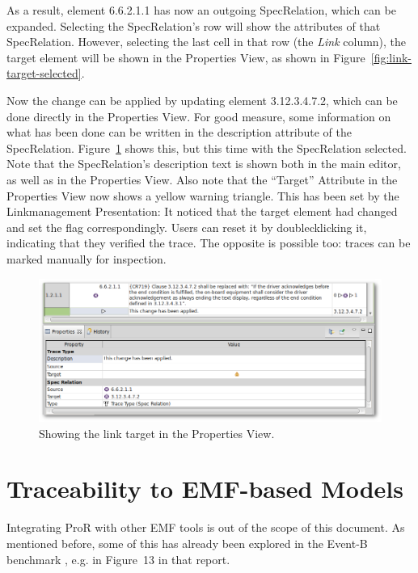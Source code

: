 \documentclass{template/openetcs_report}
\begin{document}
As a result, element 6.6.2.1.1 has now an outgoing SpecRelation, which can be expanded.  Selecting the SpecRelation's row will show the attributes of that SpecRelation.  However, selecting the last cell in that row (the \emph{Link} column), the target element will be shown in the Properties View, as shown in Figure~\ref{fig:link-target-selected}.

Now the change can be applied by updating element 3.12.3.4.7.2, which can be done directly in the Properties View.  For good measure, some information on what has been done can be written in the description attribute of the SpecRelation.  Figure~\ref{fig:link-target-changed} shows this, but this time with the SpecRelation selected.  Note that the SpecRelation's description text is shown both in the main editor, as well as in the Properties View.  Also note that the ``Target'' Attribute in the Properties View now shows a yellow warning triangle.  This has been set by the Linkmanagement Presentation: It noticed that the target element had changed and set the flag correspondingly.  Users can reset it by doublecklicking it, indicating that they verified the trace.  The opposite is possible too: traces can be marked manually for inspection.

\begin{figure}
	\begin{center}
	\includegraphics[width=\textwidth]{img/link-target-changed.png}
	\end{center}
	\caption{Showing the link target in the Properties View.}
	\label{fig:link-target-changed}
\end{figure} 

\section{Traceability to EMF-based Models}
\label{sec:emf-traceability}

Integrating ProR with other EMF tools is out of the scope of this document.  As mentioned before, some of this has already been explored in the Event-B benchmark \cite{event_b_benchmark}, e.g. in Figure~13 in that report.
\end{document}
